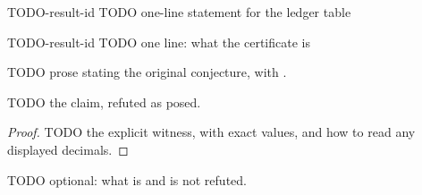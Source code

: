 \begin{cxsummary}{TODO-result-id}
TODO one-line statement for the ledger table
\end{cxsummary}

\begin{cxcertificate}{TODO-result-id}
TODO one line: what the certificate is
\end{cxcertificate}

\begin{cxrefutation}
TODO prose stating the original conjecture, with \cite{key}.

\begin{theorem}\label{thm:TODO}
TODO the claim, refuted as posed.
\end{theorem}
\begin{proof}
TODO the explicit witness, with exact values, and how to read any displayed
decimals.
\end{proof}

\begin{remark}[Scope]
TODO optional: what is and is not refuted.
\end{remark}
\end{cxrefutation}

